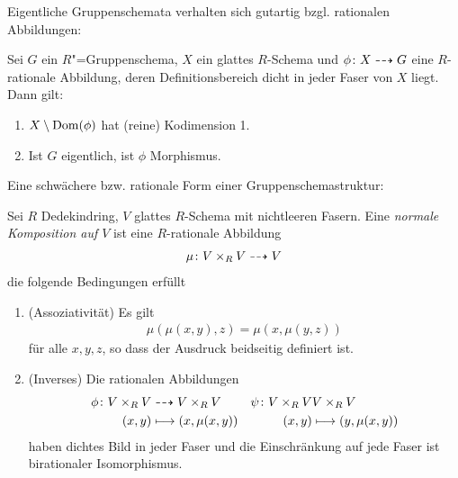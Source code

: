 \documentclass[german]{scrreprt}
\begin{document}
Eigentliche Gruppenschemata verhalten sich gutartig bzgl. rationalen
Abbildungen: 
\begin{Lemma}\label{thm:rationalzumorphismus}
  Sei $G$ ein $R$"=Gruppenschema, $X$ ein glattes $R$-Schema und
  $\phi\colon X\dashrightarrow G$ eine $R$-rationale Abbildung, deren
  Definitionsbereich dicht in jeder Faser von $X$ liegt.
  Dann gilt:
  \begin{enumerate}[label=(\roman*)]
  \item $X\setminus \operatorname{Dom}(\phi)$ hat (reine) Kodimension 1.
  \item Ist $G$ eigentlich, ist $\phi$ Morphismus.
  \end{enumerate}
  \cite[Proposition IV.6.2]{silverman2}
\end{Lemma}


Eine schwächere bzw. rationale Form einer Gruppenschemastruktur:
\begin{Definition}\label{def:normalekomposition}
  Sei $R$ Dedekindring, $V$ glattes $R$-Schema mit nichtleeren Fasern.
  Eine \emph{normale Komposition auf $V$} ist eine $R$-rationale
  Abbildung
  \begin{gather*}
    \mu\colon V\times_R V\dashrightarrow V
  \end{gather*}
  die folgende Bedingungen erfüllt
  \begin{enumerate}[label=(\alph*)]
  \item (Assoziativität) Es gilt
    \begin{gather*}
      \mu(\mu(x,y),z)=\mu(x,\mu(y,z))
    \end{gather*}
    für alle $x,y,z$, so dass der Ausdruck beidseitig definiert ist.
  \item (Inverses)
    Die rationalen Abbildungen
    \begin{align*}
      \phi\colon V\times_R V
      &\dashrightarrow V\times_R V
      &\psi\colon V\times_R V
      & V\times_R V\\
      (x,y)
      &\longmapsto (x,\mu(x,y))
      &(x,y)
      &\longmapsto (y,\mu(x,y))       
    \end{align*}
    haben dichtes Bild in jeder Faser und die Einschränkung auf jede
    Faser ist birationaler Isomorphismus.
  \end{enumerate}
\end{Definition}
\end{document}
